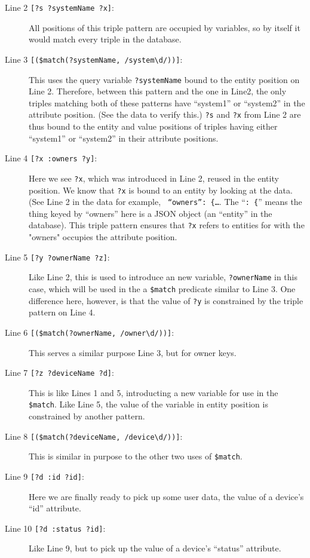 \documentclass[9pt,letterpaper]{article}
\newcommand{\stt}[1]{\texttt{#1}} %
\begin{document}
\begin{description}
\item[Line 2 \stt{[?s ?systemName ?x]}:] All positions of this triple pattern are occupied by variables, so by itself it would match every triple in the database.
\item[Line 3 \stt{[(\$match(?systemName, /system\textbackslash d/))]}:] This uses the query variable \stt{?systemName} bound to the entity position on Line 2.
  Therefore, between this pattern and the one in Line2, the only triples matching both of these patterns have ``system1'' or ``system2'' in the attribute position. (See the data to verify this.)
  \stt{?s} and \stt{?x} from Line 2 are thus bound to the entity and value positions of triples having either ``system1'' or ``system2'' in their attribute positions.
\item[Line 4 \stt{[?x :owners ?y]}:] Here we see \stt{?x}, which was introduced in Line 2, reused in the entity position.
  We know that \stt{?x} is bound to an entity by looking at the data.
  (See Line 2 in the data for example, \stt{ ``owners'': \{\ldots}. The ``\stt{: \{}'' means the thing keyed by ``owners'' here is a JSON object (an ``entity'' in the database).
  This triple pattern ensures that \stt{?x} refers to entities for with the "owners" occupies the attribute position.
\item[Line 5 \stt{[?y ?ownerName ?z]}:]  Like Line 2, this is used to introduce an new variable, \stt{?ownerName} in this case, which will be used in the a \stt{\$match} predicate similar to Line 3.
  One difference here, however, is that the value of \stt{?y} is constrained by the triple pattern on Line 4.
\item[Line 6 \stt{[(\$match(?ownerName, /owner\textbackslash d/))]}:] This serves a similar purpose Line 3, but for owner keys.
\item[Line 7 \stt{[?z ?deviceName ?d]}:] This is like Lines 1 and 5, introducting a new variable for use in the \stt{\$match}.
  Like Line 5, the value of the variable in entity position is constrained by another pattern.
\item[Line 8 \stt{[(\$match(?deviceName, /device\textbackslash d/))]}:] This is similar in purpose to the other two uses of \stt{\$match}.
\item[Line 9 \stt{[?d :id ?id]}:] Here we are finally ready to pick up some user data, the value of a device's ``id'' attribute.
\item[Line 10 \stt{[?d :status ?id]}:] Like Line 9, but to pick up the value of a device's ``status'' attribute.
\end{description}
\end{document}
